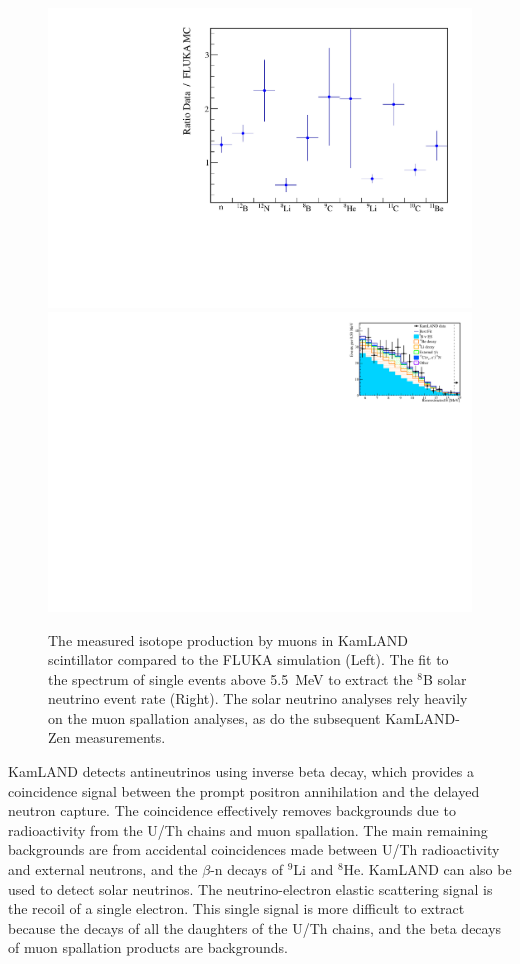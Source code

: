 \begin{figure}
\begin{center}
\includegraphics[width=0.48\columnwidth]{kamlandspall.pdf} 
\includegraphics[width=0.48\columnwidth]{Kam8BSpec_1Sept2011.pdf} 
\caption{\label{kamSpallSol} The measured isotope production by muons in KamLAND scintillator compared to the FLUKA simulation\cite{kamspall} (Left). The fit to the spectrum of single events above 5.5~MeV to extract the $^{8}$B solar neutrino event rate \cite{kamboron}(Right). The solar neutrino analyses rely heavily on the muon spallation analyses, as do the subsequent KamLAND-Zen measurements.}
\end{center}
\end{figure}

KamLAND detects antineutrinos using inverse beta decay, which provides a coincidence signal between the prompt positron annihilation and the delayed neutron capture. The coincidence effectively removes backgrounds due to  radioactivity from the U/Th chains and muon spallation. The main remaining backgrounds are from accidental coincidences made between U/Th radioactivity and external neutrons, and the $\beta$-n decays of $^{9}$Li and $^{8}$He.  KamLAND can also be used to detect solar neutrinos. The neutrino-electron elastic scattering signal is the recoil of a single electron. This single signal is more difficult to extract because the decays of all the daughters of the U/Th chains, and the beta decays of muon spallation products are backgrounds. 


